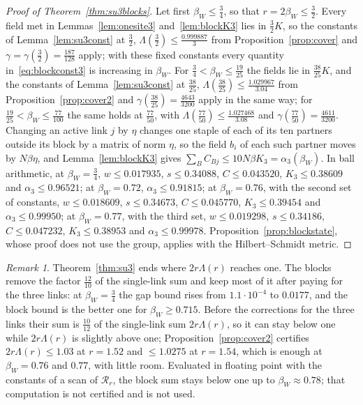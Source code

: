 \documentclass[11pt]{amsart}
\theoremstyle{definition}
\theoremstyle{remark}
\newtheorem{remark}[theorem]{Remark}
\numberwithin{equation}{section}
\begin{document}
\begin{proof}[Proof of Theorem~\ref{thm:su3blocks}]
Let first $\beta_W\le\frac34$, so that $r=2\beta_W\le\frac32$. Every field
met in Lemmas~\ref{lem:onesite3} and~\ref{lem:blockK3} lies in $\frac32K$, so
the constants of Lemma~\ref{lem:su3const} at $\frac32$,
$\Lambda(\frac32)\le\frac{0.999887}3$ from Proposition~\ref{prop:cover} and
$\gamma=\gamma(\frac32)=\frac{187}{128}$ apply; with these fixed constants every
quantity in~\eqref{eq:blockconst3} is increasing in $\beta_W$. For
$\frac34<\beta_W\le\frac{19}{25}$ the fields lie in $\frac{38}{25}K$, and the
constants of Lemma~\ref{lem:su3const} at $\frac{38}{25}$,
$\Lambda(\frac{38}{25})\le\frac{1.029967}{3.04}$ from
Proposition~\ref{prop:cover2} and $\gamma(\frac{38}{25})=\frac{4643}{3200}$
apply in the same way; for $\frac{19}{25}<\beta_W\le\frac{77}{100}$ the
same holds at $\frac{77}{50}$, with $\Lambda(\frac{77}{50})\le\frac{1.027468}{3.08}$
and $\gamma(\frac{77}{50})=\frac{4611}{3200}$. Changing an active link $j$ by $\eta$ changes one
staple of each of its ten partners outside its block by a matrix of norm
$\eta$, so the field $b_i$ of each such partner moves by $N\beta\eta$, and
Lemma~\ref{lem:blockK3} gives $\sum_BC_{Bj}\le10N\beta K_3=\alpha_3(\beta_W)$.
In ball arithmetic, at $\beta_W=\frac34$, $w\le0.017935$, $s\le0.34088$,
$C\le0.043520$, $K_3\le0.38609$ and $\alpha_3\le0.96521$; at $\beta_W=0.72$,
$\alpha_3\le0.91815$; at $\beta_W=0.76$, with the second set of constants,
$w\le0.018609$, $s\le0.34673$, $C\le0.045770$, $K_3\le0.39454$ and
$\alpha_3\le0.99950$; at $\beta_W=0.77$, with the third set,
$w\le0.019298$, $s\le0.34186$, $C\le0.047232$, $K_3\le0.38953$ and
$\alpha_3\le0.99978$. Proposition~\ref{prop:blockstate}, whose proof does not
use the group, applies with the Hilbert--Schmidt metric.
\end{proof}

\begin{remark}\label{rem:su3blocks}
Theorem~\ref{thm:su3} ends where $2r\Lambda(r)$ reaches one. The blocks
remove the factor $\frac{12}{10}$ of the single-link sum and keep most of it
after paying for the three links: at $\beta_W=\frac34$ the gap bound rises
from $1.1\cdot10^{-4}$ to $0.0177$, and the block bound is the better one for
$\beta_W\ge0.715$. Before the corrections for the three links their sum is
$\frac{10}{12}$ of the single-link sum $2r\Lambda(r)$, so it can stay below one
while $2r\Lambda(r)$ is slightly above one; Proposition~\ref{prop:cover2} certifies
$2r\Lambda(r)\le1.03$ at $r=1.52$ and $\le1.0275$ at $r=1.54$, which is
enough at $\beta_W=0.76$ and $0.77$, with little room. Evaluated in floating point with the constants of a scan of
$\mathcal R_r$, the block sum stays below one up to $\beta_W\approx0.78$;
that computation is not certified and is not used.
\end{remark}
\end{document}
